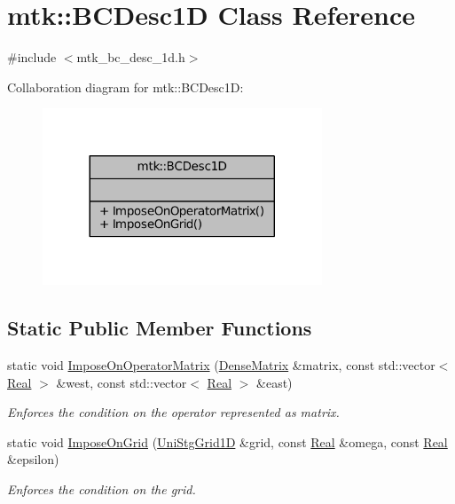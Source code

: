 \hypertarget{classmtk_1_1BCDesc1D}{\section{mtk\+:\+:B\+C\+Desc1\+D Class Reference}
\label{classmtk_1_1BCDesc1D}
}


{\ttfamily \#include $<$mtk\+\_\+bc\+\_\+desc\+\_\+1d.\+h$>$}



Collaboration diagram for mtk\+:\+:B\+C\+Desc1\+D\+:\nopagebreak
\begin{figure}[H]
\begin{center}
\leavevmode
\includegraphics[width=236pt]{classmtk_1_1BCDesc1D__coll__graph}
\end{center}
\end{figure}
\subsection*{Static Public Member Functions}
\begin{DoxyCompactItemize}
\item 
static void \hyperlink{classmtk_1_1BCDesc1D_a5e5dcda1780b9aa404e836c4c27ac08f}{Impose\+On\+Operator\+Matrix} (\hyperlink{classmtk_1_1DenseMatrix}{Dense\+Matrix} \&matrix, const std\+::vector$<$ \hyperlink{group__c01-roots_gac080bbbf5cbb5502c9f00405f894857d}{Real} $>$ \&west, const std\+::vector$<$ \hyperlink{group__c01-roots_gac080bbbf5cbb5502c9f00405f894857d}{Real} $>$ \&east)
\begin{DoxyCompactList}\small\item\em Enforces the condition on the operator represented as matrix. \end{DoxyCompactList}\item 
static void \hyperlink{classmtk_1_1BCDesc1D_a79a659c6a6333af8e51c463cf1ecb0b7}{Impose\+On\+Grid} (\hyperlink{classmtk_1_1UniStgGrid1D}{Uni\+Stg\+Grid1\+D} \&grid, const \hyperlink{group__c01-roots_gac080bbbf5cbb5502c9f00405f894857d}{Real} \&omega, const \hyperlink{group__c01-roots_gac080bbbf5cbb5502c9f00405f894857d}{Real} \&epsilon)
\begin{DoxyCompactList}\small\item\em Enforces the condition on the grid. \end{DoxyCompactList}\end{DoxyCompactItemize}


